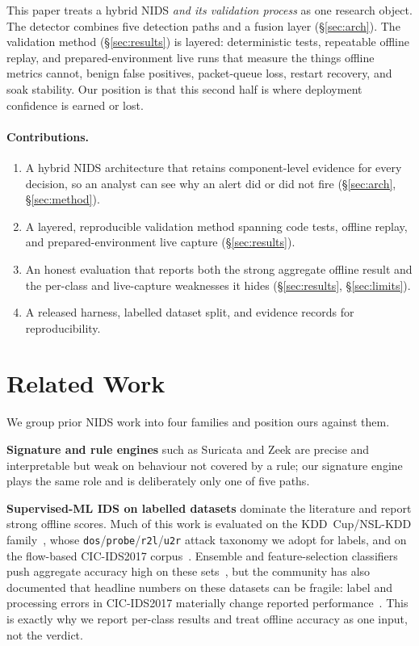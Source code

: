 \documentclass[11pt]{article}
\newcommand{\code}[1]{\texttt{#1}}
\begin{document}
This paper treats a hybrid NIDS \emph{and its validation process} as one research
object. The detector combines five detection paths and a fusion layer
(\S\ref{sec:arch}). The validation method (\S\ref{sec:results}) is layered:
deterministic tests, repeatable offline replay, and prepared-environment live
runs that measure the things offline metrics cannot, benign false positives,
packet-queue loss, restart recovery, and soak stability. Our position is that
this second half is where deployment confidence is earned or lost.

\paragraph{Contributions.}
\begin{enumerate}
  \item A hybrid NIDS architecture that retains component-level evidence for every
        decision, so an analyst can see why an alert did or did not fire
        (\S\ref{sec:arch}, \S\ref{sec:method}).
  \item A layered, reproducible validation method spanning code tests, offline
        replay, and prepared-environment live capture (\S\ref{sec:results}).
  \item An honest evaluation that reports both the strong aggregate offline
        result and the per-class and live-capture weaknesses it hides
        (\S\ref{sec:results}, \S\ref{sec:limits}).
  \item A released harness, labelled dataset split, and evidence records for
        reproducibility.
\end{enumerate}

\section{Related Work}
\label{sec:related}

We group prior NIDS work into four families and position ours against them.

\textbf{Signature and rule engines} such as Suricata and Zeek are precise and
interpretable but weak on behaviour not covered by a rule; our signature engine
plays the same role and is deliberately only one of five paths.

\textbf{Supervised-ML IDS on labelled datasets} dominate the literature and report
strong offline scores. Much of this work is evaluated on the KDD~Cup/NSL-KDD
family~\cite{nslkdd}, whose \code{dos}/\code{probe}/\code{r2l}/\code{u2r} attack
taxonomy we adopt for labels, and on the flow-based CIC-IDS2017
corpus~\cite{cicids2017}. Ensemble and feature-selection classifiers push
aggregate accuracy high on these sets~\cite{ensembleids}, but the community has
also documented that headline numbers on these datasets can be fragile: label and
processing errors in CIC-IDS2017 materially change reported
performance~\cite{cicidstrouble}. This is exactly why we report per-class results
and treat offline accuracy as one input, not the verdict.
\end{document}
